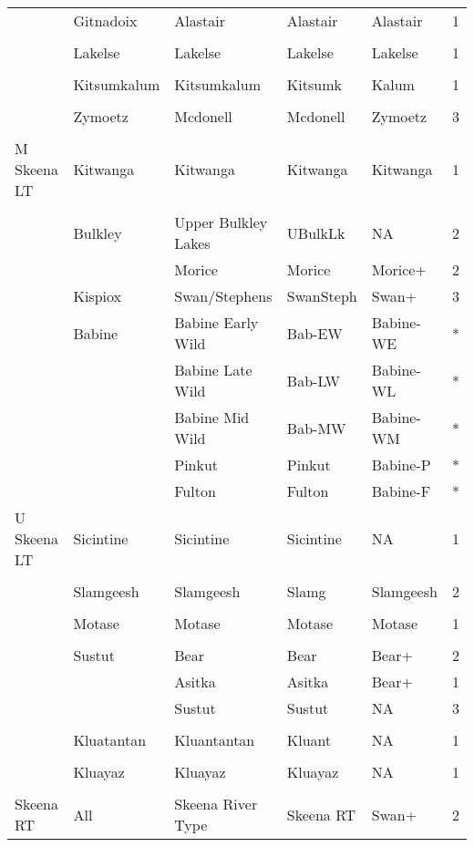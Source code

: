 \documentclass[french,11pt]{book}
\begin{document}
\begin{longtable}[t]{lllllr}
\cmidrule(l){2-6}\\  & Gitnadoix & Alastair & Alastair & Alastair & 1\\
\cmidrule(l){2-6}\\  & Lakelse & Lakelse & Lakelse & Lakelse & 1\\
\cmidrule(l){2-6}\\  & Kitsumkalum & Kitsumkalum & Kitsumk & Kalum & 1\\
\cmidrule(l){2-6}\\  & Zymoetz & Mcdonell & Mcdonell & Zymoetz & 3\\
\midrule\\ M Skeena LT & Kitwanga & Kitwanga & Kitwanga & Kitwanga & 1\\
\cmidrule(l){2-6}\\  & Bulkley & Upper Bulkley Lakes & UBulkLk & NA & 2\\  &  & Morice & Morice & Morice+ & 2\\
\cmidrule(l){2-6}  & Kispiox & Swan/Stephens & SwanSteph & Swan+ & 3\\
\cmidrule(l){2-6}  & Babine & Babine Early Wild & Bab-EW & Babine-WE & *\\  &  & Babine Late Wild & Bab-LW & Babine-WL & *\\  &  & Babine Mid Wild & Bab-MW & Babine-WM & *\\  &  & Pinkut & Pinkut & Babine-P & *\\  &  & Fulton & Fulton & Babine-F & *\\
\midrule U Skeena LT & Sicintine & Sicintine & Sicintine & NA & 1\\
\cmidrule(l){2-6}\\  & Slamgeesh & Slamgeesh & Slamg & Slamgeesh & 2\\
\cmidrule(l){2-6}\\  & Motase & Motase & Motase & Motase & 1\\
\cmidrule(l){2-6}\\  & Sustut & Bear & Bear & Bear+ & 2\\  &  & Asitka & Asitka & Bear+ & 1\\  &  & Sustut & Sustut & NA & 3\\
\cmidrule(l){2-6}\\  & Kluatantan & Kluantantan & Kluant & NA & 1\\
\cmidrule(l){2-6}\\  & Kluayaz & Kluayaz & Kluayaz & NA & 1\\
\midrule\\ Skeena RT & All & Skeena River Type & Skeena RT & Swan+ & 2\\* \end{longtable}
\end{document}
